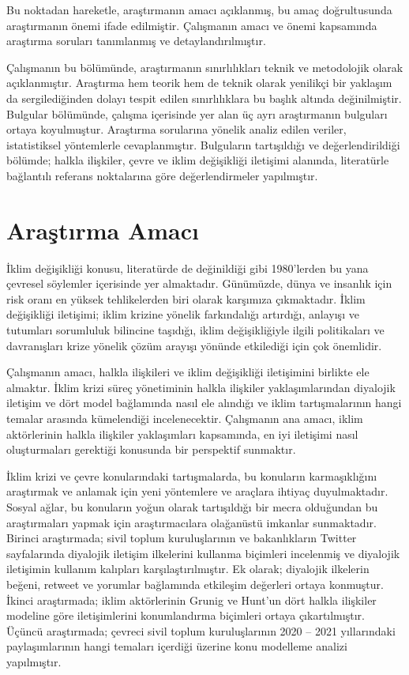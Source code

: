 \documentclass[
]{book}
\begin{document}
Bu noktadan hareketle, araştırmanın amacı açıklanmış, bu amaç doğrultusunda araştırmanın önemi ifade edilmiştir. Çalışmanın amacı ve önemi kapsamında araştırma soruları tanımlanmış ve detaylandırılmıştır.

Çalışmanın bu bölümünde, araştırmanın sınırlılıkları teknik ve metodolojik olarak açıklanmıştır. Araştırma hem teorik hem de teknik olarak yenilikçi bir yaklaşım da sergilediğinden dolayı tespit edilen sınırlılıklara bu başlık altında değinilmiştir.
Bulgular bölümünde, çalışma içerisinde yer alan üç ayrı araştırmanın bulguları ortaya koyulmuştur. Araştırma sorularına yönelik analiz edilen veriler, istatistiksel yöntemlerle cevaplanmıştır. Bulguların tartışıldığı ve değerlendirildiği bölümde; halkla ilişkiler, çevre ve iklim değişikliği iletişimi alanında, literatürle bağlantılı referans noktalarına göre değerlendirmeler yapılmıştır.

\hypertarget{araux15ftux131rma-amacux131}{%
\section{Araştırma Amacı}\label{araux15ftux131rma-amacux131}}

İklim değişikliği konusu, literatürde de değinildiği gibi 1980'lerden bu yana çevresel söylemler içerisinde yer almaktadır. Günümüzde, dünya ve insanlık için risk oranı en yüksek tehlikelerden biri olarak karşımıza çıkmaktadır. İklim değişikliği iletişimi; iklim krizine yönelik farkındalığı artırdığı, anlayışı ve tutumları sorumluluk bilincine taşıdığı, iklim değişikliğiyle ilgili politikaları ve davranışları krize yönelik çözüm arayışı yönünde etkilediği için çok önemlidir.

Çalışmanın amacı, halkla ilişkileri ve iklim değişikliği iletişimini birlikte ele almaktır. İklim krizi süreç yönetiminin halkla ilişkiler yaklaşımlarından diyalojik iletişim ve dört model bağlamında nasıl ele alındığı ve iklim tartışmalarının hangi temalar arasında kümelendiği incelenecektir. Çalışmanın ana amacı, iklim aktörlerinin halkla ilişkiler yaklaşımları kapsamında, en iyi iletişimi nasıl oluşturmaları gerektiği konusunda bir perspektif sunmaktır.

İklim krizi ve çevre konularındaki tartışmalarda, bu konuların karmaşıklığını araştırmak ve anlamak için yeni yöntemlere ve araçlara ihtiyaç duyulmaktadır. Sosyal ağlar, bu konuların yoğun olarak tartışıldığı bir mecra olduğundan bu araştırmaları yapmak için araştırmacılara olağanüstü imkanlar sunmaktadır. Birinci araştırmada; sivil toplum kuruluşlarının ve bakanlıkların Twitter sayfalarında diyalojik iletişim ilkelerini kullanma biçimleri incelenmiş ve diyalojik iletişimin kullanım kalıpları karşılaştırılmıştır. Ek olarak; diyalojik ilkelerin beğeni, retweet ve yorumlar bağlamında etkileşim değerleri ortaya konmuştur. İkinci araştırmada; iklim aktörlerinin Grunig ve Hunt'un dört halkla ilişkiler modeline göre iletişimlerini konumlandırma biçimleri ortaya çıkartılmıştır. Üçüncü araştırmada; çevreci sivil toplum kuruluşlarının 2020 -- 2021 yıllarındaki paylaşımlarının hangi temaları içerdiği üzerine konu modelleme analizi yapılmıştır.
\end{document}
